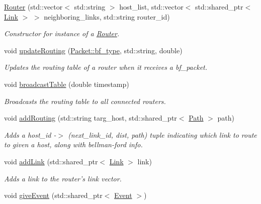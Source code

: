 \begin{DoxyCompactItemize}
\item 
\hyperlink{classRouter_a161477ea1b51f59bcd03da20b5d25243}{\-Router} (std\-::vector$<$ std\-::string $>$ host\-\_\-list, std\-::vector$<$ std\-::shared\-\_\-ptr$<$ \hyperlink{classLink}{\-Link} $>$ $>$ neighboring\-\_\-links, std\-::string router\-\_\-id)
\begin{DoxyCompactList}\small\item\em \-Constructor for instance of a \hyperlink{classRouter}{\-Router}. \end{DoxyCompactList}\item 
void \hyperlink{classRouter_a9517660547398a913aab151a3f058fbf}{update\-Routing} (\hyperlink{classPacket_a4cae1612a245ea2eadde0066ecc4b990}{\-Packet\-::bf\-\_\-type}, std\-::string, double)
\begin{DoxyCompactList}\small\item\em \-Updates the routing table of a router when it receives a bf\-\_\-packet. \end{DoxyCompactList}\item 
void \hyperlink{classRouter_a0b106e96412284611079588b65721aa6}{broadcast\-Table} (double timestamp)
\begin{DoxyCompactList}\small\item\em \-Broadcasts the routing table to all connected routers. \end{DoxyCompactList}\item 
void \hyperlink{classRouter_a923848a34881212d310a738032d31610}{add\-Routing} (std\-::string targ\-\_\-host, std\-::shared\-\_\-ptr$<$ \hyperlink{classPath}{\-Path} $>$ path)
\begin{DoxyCompactList}\small\item\em \-Adds a host\-\_\-id -\/$>$ (next\-\_\-link\-\_\-id, dist, path) tuple indicating which link to route to given a host, along with bellman-\/ford info. \end{DoxyCompactList}\item 
void \hyperlink{classRouter_aa28dfae66a6e2587d3c39da83059a866}{add\-Link} (std\-::shared\-\_\-ptr$<$ \hyperlink{classLink}{\-Link} $>$ link)
\begin{DoxyCompactList}\small\item\em \-Adds a link to the router's link vector. \end{DoxyCompactList}\item 
void \hyperlink{classRouter_aed4bdd88f4fa09cb784c5c329c935688}{give\-Event} (std\-::shared\-\_\-ptr$<$ \hyperlink{classEvent}{\-Event} $>$)

\end{DoxyCompactItemize}
